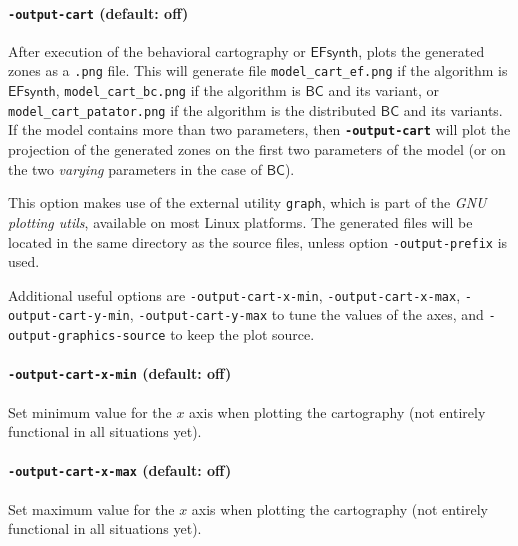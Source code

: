 \documentclass[a4paper,11pt]{report}
\newcommand{\BC}{\ensuremath{\mathsf{BC}}}
\newcommand{\EFsynth}{\ensuremath{\mathsf{EFsynth}}}
\newcommand{\code}[1]{\textbf{\texttt{#1}}}
\newcommand{\styleOption}[1]{\textcolor{optioncolor}{\texttt{#1}}}
\newcommand{\stylePath}[1]{\textcolor{pathcolor}{\texttt{#1}}}
\begin{document}
\paragraph{\styleOption{-output-cart} (default: off)}

After execution of the behavioral cartography or \EFsynth{}, plots the generated zones as a \texttt{.png} file.
This will generate file \stylePath{model\_cart\_ef.png} if the algorithm is \EFsynth{},
\stylePath{model\_cart\_bc.png} if the algorithm is \BC{} and its variant,
or \stylePath{model\_cart\_patator.png} if the algorithm is the distributed \BC{} and its variants.
If the model contains more than two parameters, then \code{-output-cart} will plot the projection of the generated zones on the first two parameters of the model (or on the two \emph{varying} parameters in the case of \BC{}).

This option makes use of the external utility \texttt{graph}, which is
part of the \emph{GNU plotting utils}, available on most Linux
platforms.
The generated files will be located in the same directory as the source files, unless option \styleOption{-output-prefix} is used.

Additional useful options are
\styleOption{-output-cart-x-min},
\styleOption{-output-cart-x-max},
\styleOption{-output-cart-y-min},
\styleOption{-output-cart-y-max}
to tune the values of the axes,
and \styleOption{-output-graphics-source} to keep the plot source.


\paragraph{\styleOption{-output-cart-x-min} (default: off)}
Set minimum value for the $x$ axis when plotting the cartography (not entirely functional in all situations yet).

\paragraph{\styleOption{-output-cart-x-max} (default: off)}
Set maximum value for the $x$ axis when plotting the cartography (not entirely functional in all situations yet).
\end{document}
